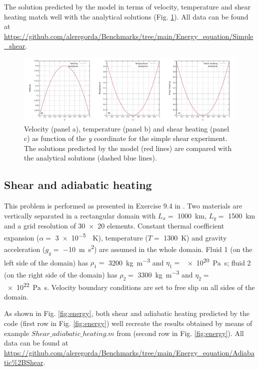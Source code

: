 \documentclass[hidelinks,10pt,a4paper]{article}
\begin{document}
The solution predicted by the model in terms of velocity, temperature and shear heating match well with the analytical solutions (Fig. \ref{fig:analytical_en}). 
All data can be found at \url{https://github.com/aleregorda/Benchmarks/tree/main/Energy_equation/Simple_shear}.


\begin{figure}
\centering
\noindent\includegraphics[width=500px]{./Figures/Analytical_Shear.pdf}
\caption{Velocity (panel a), temperature (panel b) and shear heating (panel c) as function of the \textit{y} coordinate for the simple shear experiment. The
solutions predicted by the model (red lines) are compared with the analytical solutions (dashed blue lines).}
\label{fig:analytical_en}
\end{figure}

\subsection{Shear and adiabatic heating}\label{sec:shear}
This problem is performed as presented in Exercise 9.4 in \citet{Gerya2010b}. Two materials are vertically separated in a rectangular domain with $L_x=$
\SI{1000}{\km}, $L_y=$ \SI{1500}{\km} and a grid resolution of \num{30x20} elements. Constant thermal coefficient expansion ($\alpha=$ \SI{3e-5}{\per\kelvin}),
temperature ($T=$ \SI{1300}{\kelvin}) and gravity acceleration ($g_y=$ \SI{-10}{\m\square\s}) are assumed in the whole domain. Fluid 1 (on the left side of the
domain) has $\rho_1=$ \SI{3200}{\kg\per\cubic\m} and $\eta_1=$ \SI{e20}{\pascal\s}; fluid 2 (on the right side of the domain) has $\rho_2=$
\SI{3300}{\kg\per\cubic\m} and $\eta_2=$ \SI{e22}{\pascal\s}. Velocity boundary conditions are set to free slip on all sides of the domain. 

As shown in Fig. \ref{fig:energy}, both shear and adiabatic heating predicted by the code (first row in Fig. \ref{fig:energy}) well recreate the results
obtained by means of example ${Shear\_adiabatic\_heating.m}$ from \citet{Gerya2010b} (second row in Fig. \ref{fig:energy}). 
All data can be found at \url{https://github.com/aleregorda/Benchmarks/tree/main/Energy_equation/Adiabatic%2BShear}.
\end{document}
